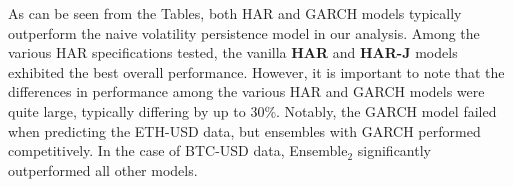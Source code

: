 \vspace{10pt}

As can be seen from the Tables, both HAR and GARCH models typically outperform the naive volatility persistence model in our analysis. Among the various HAR specifications tested, the vanilla \textbf{HAR} and \textbf{HAR-J} models exhibited the best overall performance. However, it is important to note that the differences in performance among the various HAR and GARCH models were quite large, typically differing by up to 30\%. Notably, the GARCH model failed when predicting the ETH-USD data, but ensembles with GARCH performed competitively. In the case of BTC-USD data, Ensemble$_2$ significantly outperformed all other models.



